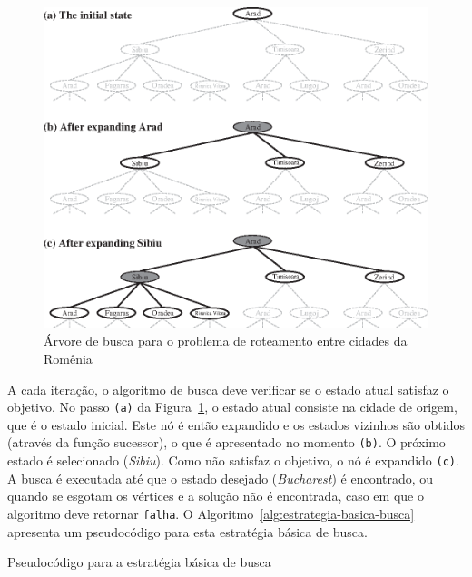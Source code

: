 \begin{figure}[h]
	\centering
	\includegraphics[width=\textwidth]{img/arvore-busca-roteamento}
	\caption{Árvore de busca para o problema de roteamento entre cidades da Romênia}
	\label{fig:arvore-busca-roteamento}
\end{figure}

A cada iteração, o algoritmo de busca deve verificar se o estado atual satisfaz o objetivo. No passo \texttt{(a)} da Figura~\ref{fig:arvore-busca-roteamento}, o estado atual consiste na cidade de origem, que é o estado inicial. Este nó é então expandido e os estados vizinhos são obtidos (através da função sucessor), o que é apresentado no momento \texttt{(b)}. O próximo estado é selecionado (\textit{Sibiu}). Como não satisfaz o objetivo, o nó é expandido \texttt{(c)}. A busca é executada até que o estado desejado (\textit{Bucharest}) é encontrado, ou quando se esgotam os vértices e a solução não é encontrada, caso em que o algoritmo deve retornar \texttt{falha}. O Algoritmo~\ref{alg:estrategia-basica-busca} apresenta um pseudocódigo para esta estratégia básica de busca.

\begin{algorithm}[h]
	\DontPrintSemicolon
	
	
	\caption{Pseudocódigo para a estratégia básica de busca}
	\label{alg:estrategia-basica-busca}
\end{algorithm}

